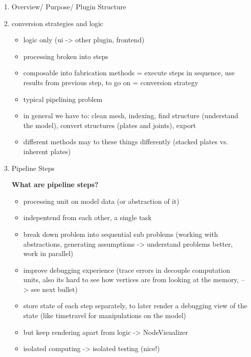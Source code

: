 \documentclass[../ClassicThesis.tex]{subfiles}
\begin{document}
\begin{enumerate}
\item Overview/ Purpose/ Plugin Structure

\item conversion strategies and logic

  \begin{itemize}
  \item logic only (ui -> other plugin, frontend)
  \item processing broken into steps
  \item composable into fabrication methods = execute steps in sequence, use
    results from previous step, to go on = conversion strategy

  \item typical pipelining problem 
  \item in general we have to: clean mesh, indexing, find structure (understand
    the model), convert structures (plates and joints), export
  \item different methods may to these things differently (stacked plates vs.
    inherent plates)

  \end{itemize}

\item Pipeline Steps

  \textbf{What are pipeline steps?}

  \begin{itemize}
  \item processing unit on model data (or abstraction of it)
  \item indepentend from each other, a single task
  \item break down problem into sequential sub problems (working with
    abstractions, generating assumptions -> understand problems better, work in parallel)
  \item improve debugging experience (trace errors in decouple computation
    units, also its hard to see how vertices are from
    looking at the memory, --> see next bullet)
  \item store state of each step separately, to later render a debugging view of
    the state (like timetravel for manipulations on the model)
  \item but keep rendering apart from logic -> NodeVisualizer
  \item isolated computing -> isolated testing (nice!)
  \end{itemize}


\end{enumerate}
\end{document}
